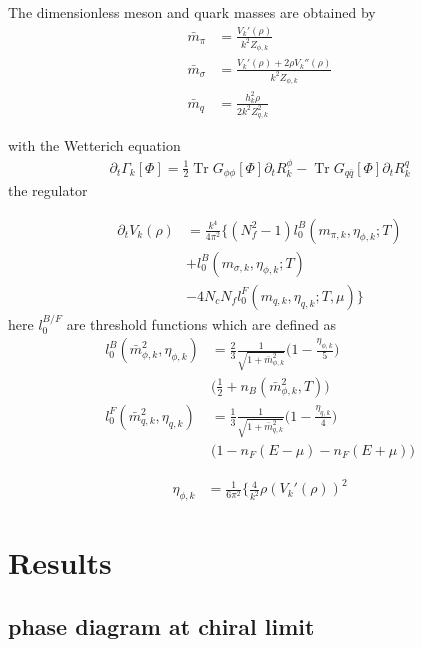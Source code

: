 \documentclass[%
reprint,
superscriptaddress,
showpacs,preprintnumbers,
 amsmath,amssymb,
 aps,
prd,
]{revtex4-1}
\newcommand{\Tr}{\ensuremath{\operatorname{Tr}}}
\begin{document}
The dimensionless meson and quark masses are obtained by
\begin{align}
	\bar m_\pi&=\frac{V_k'(\rho)}{k^2 Z_{\phi,k}} \\[2ex]
	\bar m_\sigma&= \frac{V_k'(\rho)+2 \rho V_k''(\rho)} {k^2 Z_{\phi,k}}\\[2ex]
	\bar m_q&=\frac{h_k^2 \rho}{2 k^2 Z_{q,k}^2}
\end{align}

with the Wetterich equation
\begin{align}
	\partial_t \Gamma_k [\Phi] = \frac{1}{2}\Tr G_{\phi \phi} [\Phi]  \partial_t R^\phi_k-\Tr G_{q \bar q}[\Phi] \partial_t R^q_k
\end{align}
the regulator

\begin{align}
	\partial_t V_k(\rho) &=\frac{k^4}{4 \pi^2} \{ ( N_f^2-1)l_0^B(m_{\pi,k},\eta_{\phi,k} ; T)\nonumber\\[2ex]
	&+l_0^B(m_{\sigma,k},\eta_{\phi,k}; T) \nonumber\\[2ex]
	&-4N_c N_f l_0^F(m_{q,k},\eta_{q,k};T,\mu)\}
\end{align}
here $l_0^{B/F}$ are threshold functions which are defined as
\begin{align}
	l_0^B(\bar m_{\phi,k}^2,\eta_{\phi,k}) &=\frac{2}{3}\frac{1}{\sqrt{1+\bar m_{\phi,k}^2}} \Big ( 1-\frac{\eta_{\phi,k}}{5}\Big) \nonumber\\[2ex] 
	&\Big( \frac{1}{2}+n_B(\bar m_{\phi,k}^2,T) \Big)  \\[2ex]
	l_0^F(\bar m_{q,k}^2,\eta_{q,k})&=\frac{1}{3} \frac{1}{\sqrt{1+\bar m_{q,k}^2}} \Big(1-\frac{\eta_{q,k}}{4}\Big) \nonumber\\[2ex]
	&\Big(1-n_F(E-\mu)-n_F(E+\mu))
\end{align}

\begin{align}
	\eta_{\phi,k}&=\frac{1}{6\pi^2} \Big\{ \frac{4}{k^2} \rho (V_k'(\rho))^2
\end{align}
\section{Results}
\label{sec:Results}

\subsection{phase diagram at chiral limit}
\end{document}

